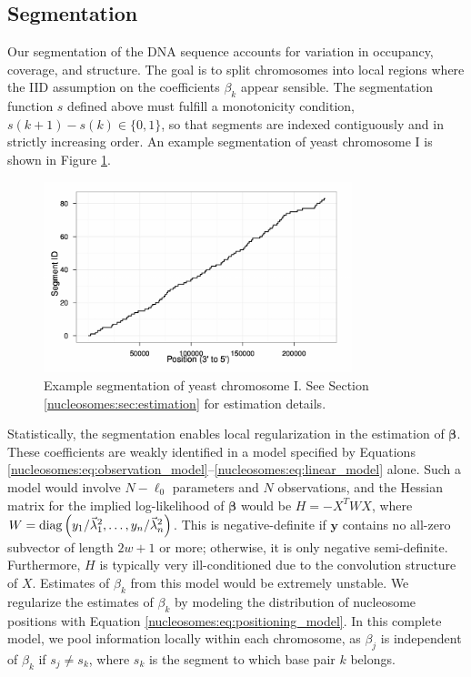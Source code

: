 \subsection{Segmentation}
\label{nucleosomes:sec:segmentation}

Our segmentation of the DNA sequence accounts for variation in occupancy, coverage, and structure.
%
The goal is to split chromosomes into local regions where the IID assumption on the coefficients $\beta_k$ appear sensible.
The segmentation function $s$ defined above must fulfill a monotonicity condition, $s(k+1)-s(k) \in \{0,1\}$, so that segments are indexed contiguously and in strictly increasing order.
An example segmentation of yeast chromosome I is shown in Figure \ref{nucleosomes:fig:segmentation}.
%
\ifx\nofigures\undefined
\begin{figure}[t!]
\centering
 \includegraphics[width=0.8\textwidth]{figures/nucleosomes/plotRegions_H_1-combined_chrom01-small}
 \caption{Example segmentation of yeast chromosome I. See Section \ref{nucleosomes:sec:estimation} for estimation details.\label{nucleosomes:fig:segmentation}} 
\end{figure}
\fi

Statistically, the segmentation enables local regularization in the estimation of $\bm \beta$.
% 
These coefficients are weakly identified in a model specified by Equations \ref{nucleosomes:eq:observation_model}--\ref{nucleosomes:eq:linear_model} alone.
Such a model would involve $N - \ell_0$ parameters and $N$ observations, and the Hessian matrix for the implied log-likelihood of $\bm \beta$ would be $H = - X^T W X$, where $W = \mathrm{diag}\left(y_1 / \vec \lambda_1^2, \ldots, y_n / \vec \lambda_n^2\right)$.
This is negative-definite if $\bm y$ contains no all-zero subvector of length $2w+1$ or more; otherwise, it is only negative semi-definite.
Furthermore, $H$ is typically very ill-conditioned due to the convolution structure of $X$.
Estimates of $\beta_k$ from this model would be extremely unstable.
%
We regularize the estimates of $\beta_k$ by modeling the distribution of nucleosome positions with Equation \ref{nucleosomes:eq:positioning_model}.
In this complete model, we pool information locally within each chromosome, as $\beta_j$ is independent of $\beta_k$ if $s_j \neq s_k$, where $s_k$ is the segment to which base pair $k$ belongs.


